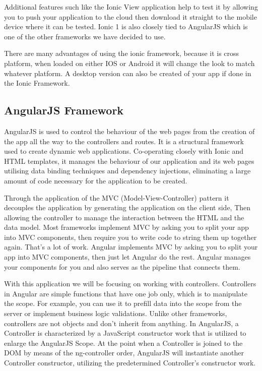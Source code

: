 Additional features such like the Ionic View application help to test it by allowing you to push your application to the cloud then download it straight to the mobile device where it can be tested. Ionic 1 is also closely tied to AngularJS which is one of the other frameworks we have decided to use.

There are many advantages of using the ionic framework, because it is cross platform, when loaded on either IOS or Android it will change the look to match whatever platform. A desktop version can also be created of your app if done in the Ionic Framework.


\subsection{AngularJS Framework}
AngularJS is used to control the behaviour of the web pages from the creation of the app all the way to the controllers and routes. It is a structural framework used to create dynamic web applications. Co-operating closely with Ionic and HTML templates, it manages the behaviour of our application and its web pages utilising data binding techniques and dependency injections, eliminating a large amount of code necessary for the application to be created. 

Through the application of the MVC (Model-View-Controller) pattern it decouples the application by generating the application on the client side,
Then allowing the controller to manage the interaction between the HTML and the data model. Most frameworks implement MVC by asking you to split your app into MVC components, then require you to write code to string them up together again.\cite{angular} That’s a lot of work. Angular implements MVC by asking you to split your app into MVC components, then just let Angular do the rest. Angular manages your components for you and also serves as the pipeline that connects them.\cite{angular}

With this application we will be focusing on working with controllers. Controllers in Angular are simple functions that have one job only, which is to manipulate the scope.\cite{angular} For example, you can use it to prefill data into the scope from the server or implement business logic validations.\cite{angular} Unlike other frameworks, controllers are not objects and don’t inherit from anything.\cite{angular} In AngularJS, a Controller is characterized by a JavaScript constructor work that is utilized to enlarge the AngularJS Scope. At the point when a Controller is joined to the DOM by means of the ng-controller order, AngularJS will instantiate another Controller constructor, utilizing the predetermined Controller's constructor work.


